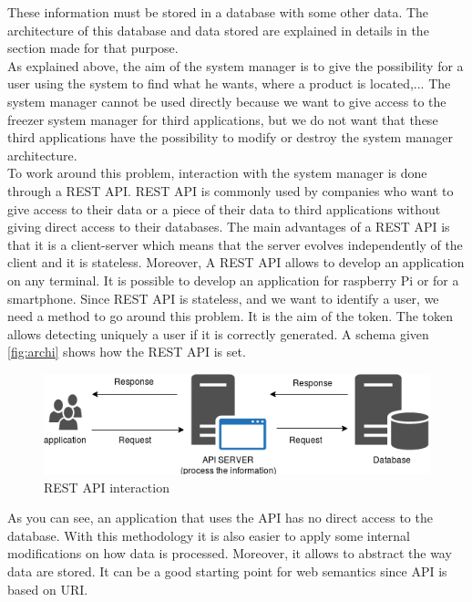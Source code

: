 These information must be stored in a database with some other data. The architecture of this database and data stored are explained in details in the section made for that purpose.\\

As explained above, the aim of the system manager is to give the possibility for a user using the system to find what he wants, where a product is located,... The system manager cannot be used directly because we want to give access to the freezer system manager for third applications, but we do not want that these third applications have the possibility to modify or destroy the system manager architecture.\\

To work around this problem, interaction with the system manager is done through a REST API. REST API is commonly used by companies who want to give access to their data or a piece of their data to third applications without giving direct access to their databases. The main advantages of a REST API is that it is a client-server which means that the server evolves independently of the client and it is stateless. Moreover, A REST API allows to develop an application on any terminal. It is possible to develop an application for raspberry Pi or for a smartphone. Since REST API is stateless, and we want to identify a user, we need a method to go around this problem. It is the aim of the token. The token allows detecting uniquely a user if it is correctly generated. A schema given \autoref{fig:archi} shows how the REST API is set. \\
\begin{figure}[H]
\centering
\includegraphics[scale=0.5]{./images/archi.png}
\caption{REST API interaction}
\label{fig:archi}
\end{figure}

As you can see, an application that uses the API has no direct access to the database. With this methodology it is also easier to apply some internal modifications on how data is processed. Moreover, it allows to abstract the way data are stored. It can be a good starting point for web semantics since API is based on URI.\\

